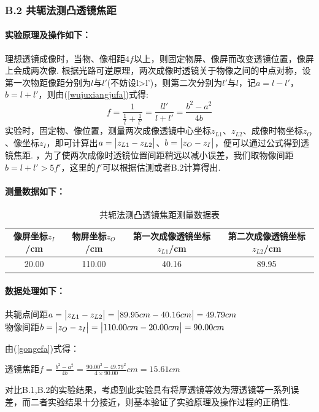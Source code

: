 \documentclass[UTF8]{ctexart}
\begin{document}
\subsubsection*{B.2 共轭法测凸透镜焦距}
\paragraph{实验原理及操作如下：}\quad\par
理想透镜成像时，当物、像相距$4f$以上，则固定物屏、像屏而改变透镜位置，像屏上会成两次像. 根据光路可逆原理，两次成像时透镜关于物像之间的中点对称，设第一次物距像距分别为$l$与$l'$(不妨设l>l')，则第二次分别为$l'$与$l$，记$a=l-l'$，$b=l+l'$，则由(\ref{wujuxiangjufa})式得:
\begin{equation}
    \label{gongefa}
    f=\frac{1}{\frac{1}{l}+\frac{1}{l'}}=\frac{ll'}{l+l'}=\frac{b^2-a^2}{4b}
\end{equation}
实验时，固定物、像位置，测量两次成像透镜中心坐标$z_{L1}$、$z_{L2}$、成像时物坐标$z_O$、像坐标$z_I$，即可计算出$a=\big{|}z_{L1}-z_{L2}\big{|}$、$b=\big{|}z_{O}-z_{I}\big{|}$，便可以通过公式得到透镜焦距. ，为了使两次成像时透镜位置间距稍远以减小误差，我们取物像间距$b=l+l'>5f'$，这里的$f'$可以根据估测或者B.2计算得出.\par

\paragraph{测量数据如下：}\quad\par
\begin{table}[H]\begin{center}
    \caption{共轭法测凸透镜焦距测量数据表}
    \begin{tabular}{|c|c|c|c|}
        \hline
        像屏坐标$z_I$/cm&物屏坐标$z_O$/cm&第一次成像透镜坐标$z_{L1}$/cm&第二次成像透镜坐标$z_{L2}$/cm\\
        \hline
        20.00&110.00&40.16&89.95\\
        \hline
    \end{tabular}
\end{center}\end{table}
\paragraph{数据处理如下：}\quad\par
\begin{center}
    共轭点间距\quad$a=\big{|}z_{L1}-z_{L2}\big{|}=\big{|}89.95cm-40.16cm\big{|}=49.79cm$\\
    物像间距\quad$b=\big{|}z_{O}-z_{I}\big{|}=\big{|}110.00cm-20.00cm\big{|}=90.00cm$
\end{center}
由(\ref{gongefa})式得：
\begin{center}
    透镜焦距\quad$\displaystyle{f=\frac{b^2-a^2}{4b}=\frac{90.00^2-49.79^2}{4\times 90.00}cm=15.61cm}$
\end{center}
对比B.1,B.2的实验结果，考虑到此实验具有将厚透镜等效为薄透镜等一系列误差，而二者实验结果十分接近，则基本验证了实验原理及操作过程的正确性.                                                
\end{document}
